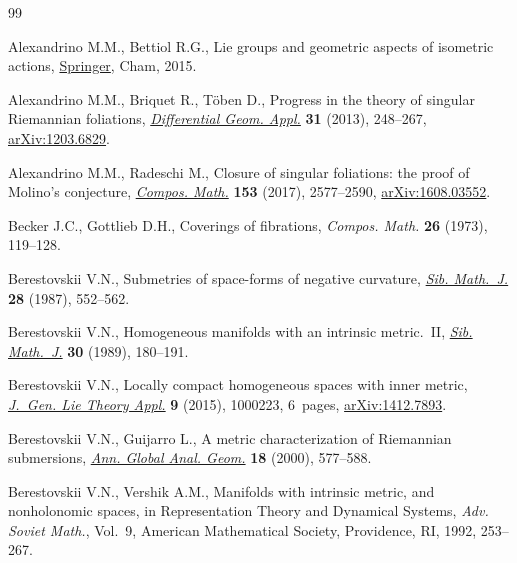 \begin{thebibliography}{99}
\footnotesize\itemsep=0pt

Alexandrino M.M., Bettiol R.G., Lie groups and geometric aspects of isometric
 actions, \href{https://doi.org/10.1007/978-3-319-16613-1}{Springer}, Cham,
 2015.

Alexandrino M.M., Briquet R., T\"oben D., Progress in the theory of singular
 {R}iemannian foliations,
 \href{https://doi.org/10.1016/j.difgeo.2013.01.004}{\textit{Differential
 Geom. Appl.}} \textbf{31} (2013), 248--267,
 \href{http://arxiv.org/abs/1203.6829}{arXiv:1203.6829}.

Alexandrino M.M., Radeschi M., Closure of singular foliations: the proof of
 {M}olino's conjecture,
 \href{https://doi.org/10.1112/S0010437X17007485}{\textit{Compos. Math.}}
 \textbf{153} (2017), 2577--2590,
 \href{http://arxiv.org/abs/1608.03552}{arXiv:1608.03552}.

Becker J.C., Gottlieb D.H., Coverings of fibrations, \textit{Compos. Math.}
 \textbf{26} (1973), 119--128.

Berestovskii V.N., Submetries of space-forms of negative curvature,
 \href{https://doi.org/10.1007/BF00973842}{\textit{Sib. Math.~J.}} \textbf{28}
 (1987), 552--562.

Berestovskii V.N., Homogeneous manifolds with an intrinsic metric.~{II},
 \href{https://doi.org/10.1007/BF00971372}{\textit{Sib. Math.~J.}} \textbf{30}
 (1989), 180--191.

Berestovskii V.N., Locally compact homogeneous spaces with inner metric,
 \href{https://doi.org/10.4172/1736-4337.1000223}{\textit{J.~Gen. Lie Theory
 Appl.}} \textbf{9} (2015), 1000223, 6~pages,
 \href{http://arxiv.org/abs/1412.7893}{arXiv:1412.7893}.

Berestovskii V.N., Guijarro L., A metric characterization of {R}iemannian
 submersions, \href{https://doi.org/10.1023/A:1006683922481}{\textit{Ann.
 Global Anal. Geom.}} \textbf{18} (2000), 577--588.

Berestovskii V.N., Vershik A.M., Manifolds with intrinsic metric, and
 nonholonomic spaces, in Representation {T}heory and {D}ynamical {S}ystems,
 \textit{Adv. Soviet Math.}, Vol.~9, American Mathematical Society,
 Providence, RI, 1992, 253--267.


\end{thebibliography}

